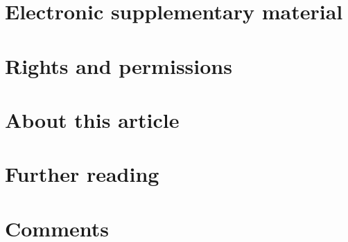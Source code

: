 \documentclass[11pt]{article}
\begin{document}
\section*{Electronic supplementary material}
\label{sec:orgbd84ddc}
\section*{Rights and permissions}
\label{sec:org7695766}
\section*{About this article}
\label{sec:org79353ae}
\section*{Further reading}
\label{sec:org1ec517f}
\section*{Comments}
\label{sec:org3b5b72a}
\end{document}
